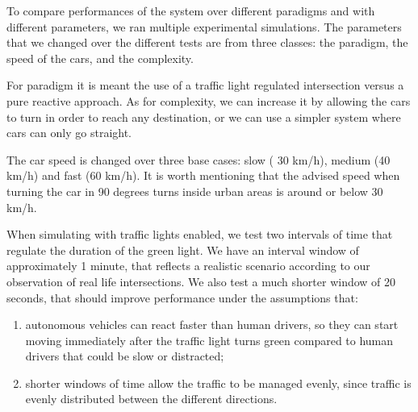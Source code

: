 

To compare performances of the system over different paradigms and with different parameters, we ran
multiple experimental simulations.
The parameters that we changed over the different tests are from three classes: the paradigm, the speed of the cars, and the complexity.

For paradigm it is meant the use of  a traffic light regulated intersection versus a pure reactive approach.
As for complexity, we can increase it by allowing the cars to turn in order to reach any destination, or we can use a simpler system where cars can only go straight.

The car speed is changed over three base cases: slow ( 30 km/h), medium (40 km/h) and fast (60 km/h).
It is worth mentioning that the advised speed when turning the car in 90 degrees turns inside urban areas is around or below 30 km/h. %

When simulating with traffic lights enabled, we test two intervals of time that regulate the duration of the green light.
We have an interval window of approximately 1 minute, that reflects a realistic scenario according to our observation of real life intersections.
We also test a much shorter window of 20 seconds, that should improve performance under the assumptions that:
\begin{enumerate}
\item autonomous vehicles can react faster than human drivers, so they can start moving immediately after the traffic light turns green compared to human drivers that could be slow or distracted;
\item shorter windows of time allow the traffic to be managed evenly, since traffic is evenly distributed between the different directions.
\end{enumerate}

